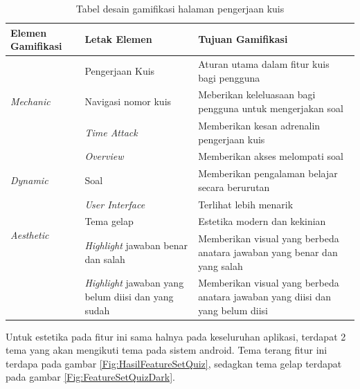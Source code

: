 \begin{table}[H]
	\caption{Tabel desain gamifikasi halaman pengerjaan kuis}
	\label{TabelGameIsiKuis}
	\begin{tabular}{|m{3.6cm}|m{}|m{}|}
		\hline
		Elemen Gamifikasi& Letak Elemen & Tujuan Gamifikasi\\
		\hline
		\multirow{3}{1cm}{\textit{Mechanic}}&Pengerjaan Kuis& Aturan utama dalam fitur kuis bagi pengguna\\
		\cline{2-3}
		&Navigasi nomor kuis&Meberikan keleluasaan bagi pengguna untuk mengerjakan soal\\
		\cline{2-3}
		&\textit{Time Attack}& Memberikan kesan adrenalin pengerjaan kuis\\
		\cline{2-3}
		&\textit{Overview}& Memberikan akses melompati soal\\
		\hline
		\textit{Dynamic}&Soal&Memberikan pengalaman belajar secara berurutan \\
		\hline
		\multirow{3}{1cm}{\textit{Aesthetic}}&\textit{User Interface}&Terlihat lebih menarik\\
		\cline{2-3}
		& Tema gelap & Estetika modern dan kekinian \\
		\cline{2-3}
		&\textit{Highlight} jawaban benar dan salah& Memberikan visual yang berbeda anatara jawaban yang benar dan yang salah\\
		\cline{2-3}
		&\textit{Highlight} jawaban yang belum diisi dan yang sudah& Memberikan visual yang berbeda anatara jawaban yang diisi dan yang belum diisi\\
		\hline
	\end{tabular}
\end{table}
Untuk estetika pada fitur ini sama halnya pada keseluruhan aplikasi, terdapat 2 tema yang akan mengikuti tema pada sistem android.
Tema terang fitur ini terdapa pada gambar \ref*{Fig:HasilFeatureSetQuiz}, sedagkan tema gelap terdapat pada gambar \ref*{Fig:FeatureSetQuizDark}.

